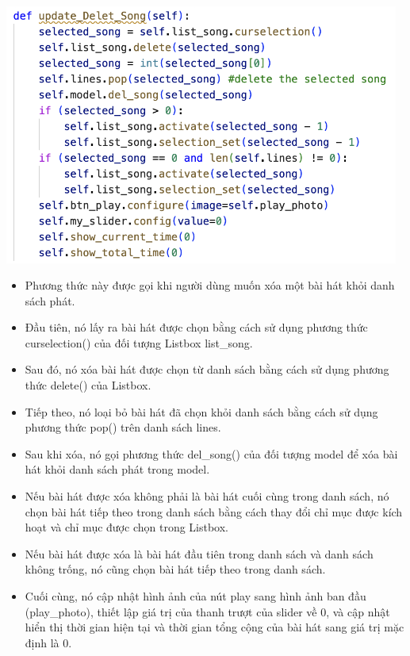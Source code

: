 \documentclass[a4paper]{article}
\begin{document}
\begin{center}
\includegraphics[width=130mm]{template_SGU 2/audio_updateDelet.png}
\end{center}
\begin{itemize}
    \item Phương thức này được gọi khi người dùng muốn xóa một bài hát khỏi danh sách phát.
    \item Đầu tiên, nó lấy ra bài hát được chọn bằng cách sử dụng phương thức curselection() của đối tượng Listbox list\_song.
    \item Sau đó, nó xóa bài hát được chọn từ danh sách bằng cách sử dụng phương thức delete() của Listbox.
    \item Tiếp theo, nó loại bỏ bài hát đã chọn khỏi danh sách bằng cách sử dụng phương thức pop() trên danh sách lines.
    \item Sau khi xóa, nó gọi phương thức del\_song() của đối tượng model để xóa bài hát khỏi danh sách phát trong model.
    \item Nếu bài hát được xóa không phải là bài hát cuối cùng trong danh sách, nó chọn bài hát tiếp theo trong danh sách bằng cách thay đổi chỉ mục được kích hoạt và chỉ mục được chọn trong Listbox.
    \item Nếu bài hát được xóa là bài hát đầu tiên trong danh sách và danh sách không trống, nó cũng chọn bài hát tiếp theo trong danh sách.
    \item Cuối cùng, nó cập nhật hình ảnh của nút play sang hình ảnh ban đầu (play\_photo), thiết lập giá trị của thanh trượt của slider về 0, và cập nhật hiển thị thời gian hiện tại và thời gian tổng cộng của bài hát sang giá trị mặc định là 0.
\end{itemize}
\end{document}
